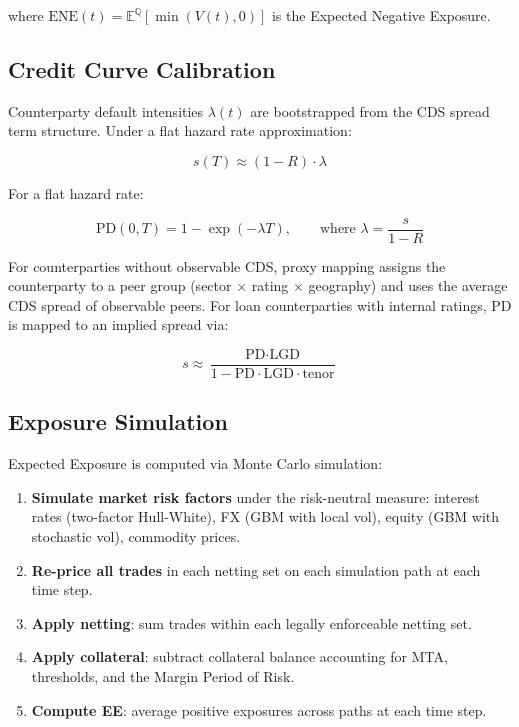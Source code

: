\documentclass[11pt,a4paper]{article}
\begin{document}
where $\text{ENE}(t) = \mathbb{E}^{\mathbb{Q}}[\min(V(t), 0)]$ is the
Expected Negative Exposure.

\subsection{Credit Curve Calibration}

Counterparty default intensities $\lambda(t)$ are bootstrapped from the CDS
spread term structure. Under a flat hazard rate approximation:

\begin{equation}
  s(T) \approx (1 - R) \cdot \lambda
  \label{eq:cds_approx}
\end{equation}

For a flat hazard rate:

\begin{equation}
  \text{PD}(0, T) = 1 - \exp(-\lambda T),
  \qquad \text{where } \lambda = \frac{s}{1 - R}
  \label{eq:flat_hazard}
\end{equation}

For counterparties without observable CDS, proxy mapping assigns the
counterparty to a peer group (sector $\times$ rating $\times$ geography) and
uses the average CDS spread of observable peers. For loan counterparties with
internal ratings, PD is mapped to an implied spread via:

\begin{equation}
  s \approx \frac{\text{PD} \cdot \text{LGD}}{1 - \text{PD} \cdot \text{LGD} \cdot \text{tenor}}
  \label{eq:pd_to_spread}
\end{equation}

\subsection{Exposure Simulation}

Expected Exposure is computed via Monte Carlo simulation:

\begin{enumerate}[noitemsep]
  \item \textbf{Simulate market risk factors} under the risk-neutral measure:
        interest rates (two-factor Hull-White), FX (GBM with local vol), equity
        (GBM with stochastic vol), commodity prices.
  \item \textbf{Re-price all trades} in each netting set on each simulation
        path at each time step.
  \item \textbf{Apply netting}: sum trades within each legally enforceable
        netting set.
  \item \textbf{Apply collateral}: subtract collateral balance accounting for
        MTA, thresholds, and the Margin Period of Risk.
  \item \textbf{Compute EE}: average positive exposures across paths at each
        time step.
\end{enumerate}
\end{document}
